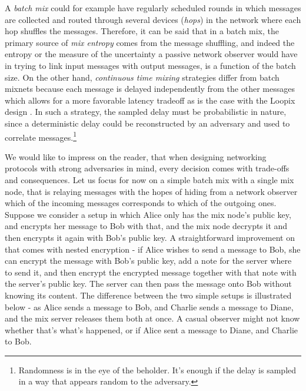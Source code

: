\documentclass{article}
\begin{document}
A \textit{batch mix} could for example have regularly scheduled rounds in which messages are collected and routed through several devices (\textit{hops}) in the network where each hop shuffles the messages. Therefore, it can be said that in a batch mix, the primary source of \textit{mix entropy} comes from the message shuffling, and indeed the entropy or the measure of the uncertainty a passive network observer would have in trying to link input messages with output messages, is a function of the batch size. On the other hand, \textit{continuous time mixing} strategies differ from batch mixnets because each message is delayed independently from the other messages which allows for a more favorable latency tradeoff as is the case with the Loopix design . In such a strategy, the sampled delay must be probabilistic in nature, since a deterministic delay could be reconstructed by an adversary and used to correlate messages.\footnote{Randomness is in the eye of the beholder. It's enough if the delay is sampled in a way that appears random to the adversary.}


We would like to impress on the reader, that when designing networking protocols with strong adversaries in mind, every decision comes with trade-offs and consequences. Let us focus for now on a simple batch mix with a single mix node, that is relaying messages with the hopes of hiding from a network observer which of the incoming messages corresponds to which of the outgoing ones. Suppose we consider a setup in which Alice only has the mix node's public key, and encrypts her message to Bob with that, and the mix node decrypts it and then encrypts it again with Bob's public key. A straightforward improvement on that comes with nested encryption - if Alice wishes to send a message to Bob, she can encrypt the message with Bob's public key, add a note for the server where to send it, and then encrypt the encrypted message together with that note with the server's public key. The server can then pass the message onto Bob without knowing its content. The difference between the two simple setups is illustrated below - as Alice sends a message to Bob, and Charlie sends a message to Diane, and the mix server releases them both at once. A casual observer might not know whether that's what's happened, or if Alice sent a message to Diane, and Charlie to Bob.
\end{document}
